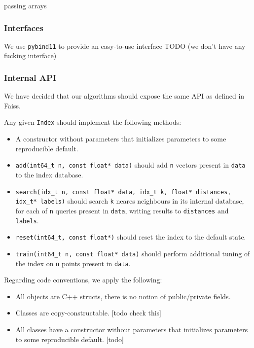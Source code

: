 passing arrays

\subsubsection{Interfaces}

We use \texttt{pybind11} to provide an easy-to-use interface
TODO (we don't have any fucking interface)

\subsubsection{Internal API}

We have decided that our algorithms should expose the same API as defined in Faiss.

Any given \texttt{Index} should implement the following methods:
\begin{itemize}

\item A constructor without parameters that initializes parameters to some reproducible default.

\item \texttt{add(int64\_t n, const float* data)} 
should add \texttt{n} vectors present in \texttt{data} to the index database.

\item \texttt{search(idx\_t n, const float* data, idx\_t k, float* distances, idx\_t* labels)} 
should search \texttt{k} neares neighbours 
in its internal database, for each of \texttt{n} queries present in \texttt{data}, writing results to \texttt{distances} and \texttt{labels}.

\item \texttt{reset(int64\_t, const float*)} 
should reset the index to the default state.

\item \texttt{train(int64\_t n, const float* data)} 
should perform additional tuning of the index on \texttt{n} points present in \texttt{data}.

\end{itemize}

Regarding code conventions, we apply the following:

\begin{itemize}
\item All objects are C++ structs, there is no notion of public/private fields.
\item Classes are copy-constructable. [todo check this]
\item All classes have a constructor without parameters that initializes parameters to some reproducible default. [todo]
\end{itemize}
